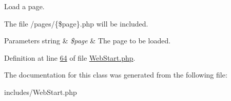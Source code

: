 Load a page. 

The file /pages/\{\$page\}.php will be included.


\begin{DoxyParams}[1]{Parameters}
string & {\em \$page} & The page to be loaded. \\
\hline
\end{DoxyParams}


Definition at line \hyperlink{WebStart_8php_source_l00064}{64} of file \hyperlink{WebStart_8php_source}{Web\-Start.\-php}.



The documentation for this class was generated from the following file\-:\begin{DoxyCompactItemize}
\item 
includes/Web\-Start.\-php\end{DoxyCompactItemize}
